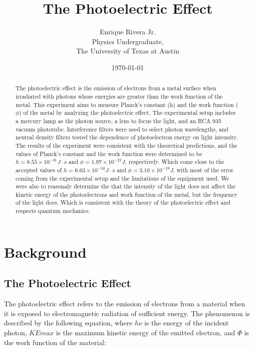 \documentclass[12pt]{article}
\title{The Photoelectric Effect}
\author{Enrique Rivera Jr. \\
                Physics Undergraduate, \\ 
                The University of Texas at Austin}
\date{\today}
\begin{document}
\maketitle

\begin{abstract}
        The photoelectric effect is the emission of electrons from a metal surface when irradiated with photons 
        whose energies are greater than the work function of the metal. This experiment aims to measure Planck's 
        constant (h) and the work function ($\phi$) of the metal by analyzing the photoelectric effect. The 
        experimental setup includes a mercury lamp as the photon source, a lens to focus the light, and an 
        RCA 935 vacuum phototube. Interference filters were used to select photon wavelengths, and neutral 
        density filters tested the dependence of photoelectron energy on light intensity. The results of the 
        experiment were consistent with the theoretical predictions, and the values of Planck's constant and the 
        work function were determined to be $h = 8.55 \times 10^{-31} J \cdot s$ and $\phi = 1.97 \times 10^{-22} J$,
        respectively. Which come close to the accepted values of $h = 6.63 \times 10^{-34} J \cdot s$ and 
        $\phi = 3.10 \times 10^{-19} J$, with most of the error coming from the experimental setup and the
        limitations of the equipment used. We were also to reasonaly determine the that the intensity of the light
        does not affect the kinetic energy of the photoelectrons and work function of the metal, but the frequency of the light does. Which is 
        consistent with the theory of the photoelectric effect and respects quantum mechanics.

\end{abstract}

\section{Background}

\subsection{The Photoelectric Effect}
The photoelectric effect refers to the emission of electrons from a material when it is exposed to 
electromagnetic radiation of sufficient energy. The phenomenon is described by the following equation, 
where \( h\nu \) is the energy of the incident photon, \( KEmax \) is the maximum kinetic energy of the 
emitted electron, and \( \Phi \) is the work function of the material:
\end{document}
